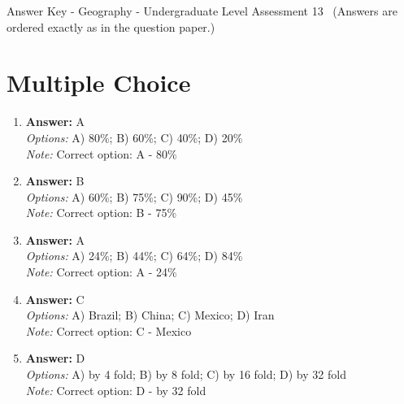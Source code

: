 \documentclass[12pt]{article}
\begin{document}
\begin{center}
Answer Key - Geography - Undergraduate Level Assessment 13 \
\small (Answers are ordered exactly as in the question paper.)
\end{center}

\section*{Multiple Choice}
\begin{enumerate}[label=\arabic*.]
\item \textbf{Answer:} A
\\ \textit{Options:} A) 80\%; B) 60\%; C) 40\%; D) 20\%
\\ \textit{Note:} Correct option: A - 80\%
\item \textbf{Answer:} B
\\ \textit{Options:} A) 60\%; B) 75\%; C) 90\%; D) 45\%
\\ \textit{Note:} Correct option: B - 75\%
\item \textbf{Answer:} A
\\ \textit{Options:} A) 24\%; B) 44\%; C) 64\%; D) 84\%
\\ \textit{Note:} Correct option: A - 24\%
\item \textbf{Answer:} C
\\ \textit{Options:} A) Brazil; B) China; C) Mexico; D) Iran
\\ \textit{Note:} Correct option: C - Mexico
\item \textbf{Answer:} D
\\ \textit{Options:} A) by 4 fold; B) by 8 fold; C) by 16 fold; D) by 32 fold
\\ \textit{Note:} Correct option: D - by 32 fold
\end{enumerate}
\end{document}
